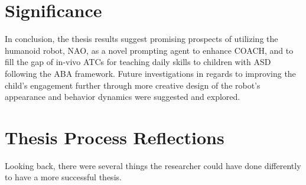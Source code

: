 
\section{Significance}
In conclusion, the thesis results suggest promising prospects of utilizing the humanoid robot, NAO, as a novel prompting agent to enhance COACH, and to fill the gap of in-vivo ATCs for teaching daily skills to children with ASD following the ABA framework.  Future investigations in regards to improving the child's engagement further through more creative design of the robot's appearance and behavior dynamics were suggested and explored.

\section{Thesis Process Reflections}
Looking back, there were several things the researcher could have done differently to have a more successful thesis.

